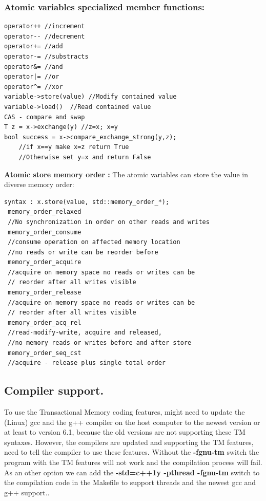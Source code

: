 \documentclass[12pt]{article}
\begin{document}
{\setlength{\parindent}{0cm}
\subsubsection{Atomic variables specialized member functions:}
}
\begin{lstlisting}
operator++ //increment
operator-- //decrement
operator+= //add
operator-= //substracts
operator&= //and
operator|= //or
operator^= //xor
variable->store(value) //Modify contained value
variable->load()  //Read contained value
CAS - compare and swap
T z = x->exchange(y) //z=x; x=y
bool success = x->compare_exchange_strong(y,z);
	//if x==y make x=z return True
	//Otherwise set y=x and return False
\end{lstlisting}

\textbf{Atomic store memory order :}
The atomic variables can store the value in diverse memory order:\cite{cppreferenceLib}
\begin{lstlisting}
syntax : x.store(value, std::memory_order_*);
 memory_order_relaxed 
 //No synchronization in order on other reads and writes
 memory_order_consume 
 //consume operation on affected memory location
 //no reads or write can be reorder before
 memory_order_acquire 
 //acquire on memory space no reads or writes can be
 // reorder after all writes visible
 memory_order_release 
 //acquire on memory space no reads or writes can be
 // reorder after all writes visible
 memory_order_acq_rel 
 //read-modify-write, acquire and released, 
 //no memory reads or writes before and after store
 memory_order_seq_cst 
 //acquire - release plus single total order 
\end{lstlisting}

\subsection{Compiler support.}
To use the Transactional Memory coding features, might need to update the (Linux) gcc and the g++ compiler on the host computer to the newest version or at least to version 6.1, because the old versions are not supporting these TM syntaxes. However, the compilers are updated and supporting the TM features, need to tell the compiler to use these features. Without the  \textbf{-fgnu-tm} switch the program with the TM features will not work and the compilation process will fail. As an other option we can add the \textbf{-std=c++1y -pthread -fgnu-tm} switch to the compilation code in the Makefile to support threads and the newest gcc and g++ support..
\end{document}

